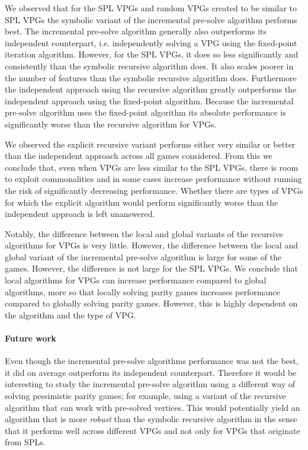 We observed that for the SPL VPGs and random VPGs created to be similar to SPL VPGs the symbolic variant of the incremental pre-solve algorithm performs best. The incremental pre-solve algorithm generally also outperforms its independent counterpart, i.e. independently solving a VPG using the fixed-point iteration algorithm. However, for the SPL VPGs, it does so less significantly and consistently than the symbolic recursive algorithm does. It also scales poorer in the number of features than the symbolic recursive algorithm does. Furthermore the independent approach using the recursive algorithm greatly outperforms the independent approach using the fixed-point algorithm. Because the incremental pre-solve algorithm uses the fixed-point algorithm its absolute performance is significantly worse than the recursive algorithm for VPGs.

We observed the explicit recursive variant performs either very similar or better than the independent approach across all games considered. From this we conclude that, even when VPGs are less similar to the SPL VPGs, there is room to exploit commonalities and in some cases increase performance without running the risk of significantly decreasing performance. Whether there are types of VPGs for which the explicit algorithm would perform significantly worse than the independent approach is left unanswered.

Notably, the difference between the local and global variants of the recursive algorithms for VPGs is very little. However, the difference between the local and global variant of the incremental pre-solve algorithm is large for some of the games. However, the difference is not large for the SPL VPGs. We conclude that local algorithms for VPGs can increase performance compared to global algorithms, more so that locally solving parity games increases performance compared to globally solving parity games. However, this is highly dependent on the algorithm and the type of VPG.

\paragraph{Future work} Even though the incremental pre-solve algorithms performance was not the best, it did on average outperform its independent counterpart. Therefore it would be interesting to study the incremental pre-solve algorithm using a different way of solving pessimistic parity games; for example, using a variant of the recursive algorithm that can work with pre-solved vertices. This would potentially yield an algorithm that is more \textit{robust}  than the symbolic recursive algorithm in the sense that it performs well across different VPGs and not only for VPGs that originate from SPLs.

